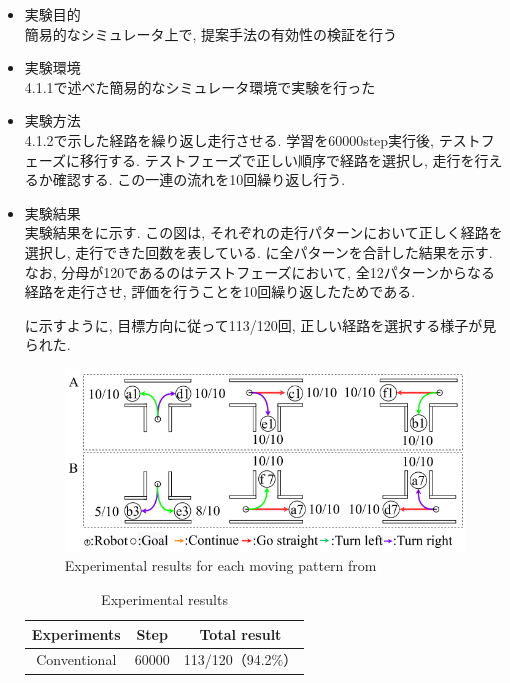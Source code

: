 \begin{itemize}
  \item 実験目的\\
  簡易的なシミュレータ上で, 提案手法の有効性の検証を行う
  \item 実験環境\\
  4.1.1で述べた簡易的なシミュレータ環境で実験を行った
  \item 実験方法\\
  4.1.2で示した経路を繰り返し走行させる. 学習を60000step実行後, テストフェーズに移行する. テストフェーズで正しい順序で経路を選択し, 走行を行えるか確認する. この一連の流れを10回繰り返し行う.

  \newpage

  \item 実験結果\\
  実験結果をに示す. この図は, それぞれの走行パターンにおいて正しく経路を選択し, 走行できた回数を表している. に全パターンを合計した結果を示す. なお, 分母が120であるのはテストフェーズにおいて, 全12パターンからなる経路を走行させ, 評価を行うことを10回繰り返したためである. 
  \par
  に示すように, 目標方向に従って113/120回, 正しい経路を選択する様子が見られた. 

\vspace{1cm}

\begin{figure}[hbtp]
  \centering
 \includegraphics[keepaspectratio, scale=0.5]
      {images/60000step.png}
 \caption{Experimental results for each moving pattern from \cite{mech}}
 \label{Fig:60000step}
\end{figure}

\vspace{1cm}

\begin{table}[hbtp]
  \caption{Experimental results}
  \label{table:result}
  \centering
  \begin{tabular}{|c|c|c|}
    \hline
    Experiments & Step & Total result\\
    \hline
    Conventional & 60000 & 113/120（94.2\%）\\
    \hline
  \end{tabular}
\end{table}

\end{itemize}

